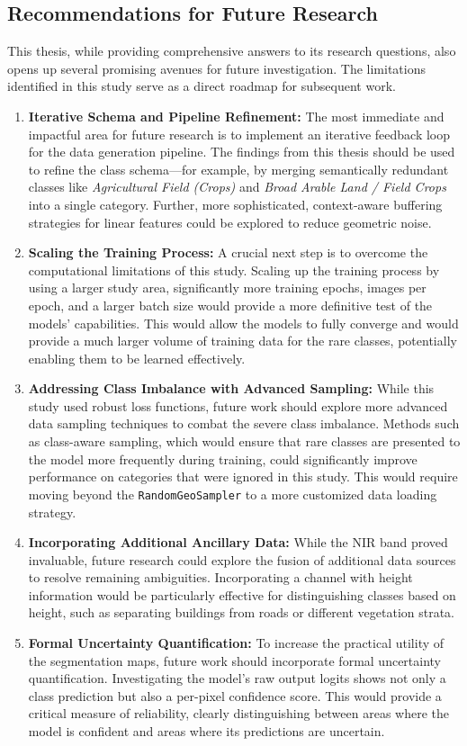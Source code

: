 \documentclass{report}
\begin{document}
\subsection{Recommendations for Future Research}
This thesis, while providing comprehensive answers to its research questions, also opens up several promising avenues for future investigation. The limitations identified in this study serve as a direct roadmap for subsequent work.
\begin{enumerate}
    \item \textbf{Iterative Schema and Pipeline Refinement:} The most immediate and impactful area for future research is to implement an iterative feedback loop for the data generation pipeline. The findings from this thesis should be used to refine the class schema—for example, by merging semantically redundant classes like \textit{Agricultural Field (Crops)} and \textit{Broad Arable Land / Field Crops} into a single category. Further, more sophisticated, context-aware buffering strategies for linear features could be explored to reduce geometric noise.
    \item \textbf{Scaling the Training Process:} A crucial next step is to overcome the computational limitations of this study. Scaling up the training process by using a larger study area, significantly more training epochs, images per epoch, and a larger batch size would provide a more definitive test of the models' capabilities. This would allow the models to fully converge and would provide a much larger volume of training data for the rare classes, potentially enabling them to be learned effectively.
    \item \textbf{Addressing Class Imbalance with Advanced Sampling:} While this study used robust loss functions, future work should explore more advanced data sampling techniques to combat the severe class imbalance. Methods such as class-aware sampling, which would ensure that rare classes are presented to the model more frequently during training, could significantly improve performance on categories that were ignored in this study. This would require moving beyond the \texttt{RandomGeoSampler} to a more customized data loading strategy.
    \item \textbf{Incorporating Additional Ancillary Data:} While the NIR band proved invaluable, future research could explore the fusion of additional data sources to resolve remaining ambiguities. Incorporating a channel with height information would be particularly effective for distinguishing classes based on height, such as separating buildings from roads or different vegetation strata.
    \item \textbf{Formal Uncertainty Quantification:} To increase the practical utility of the segmentation maps, future work should incorporate formal uncertainty quantification. Investigating the model's raw output logits shows not only a class prediction but also a per-pixel confidence score. This would provide a critical measure of reliability, clearly distinguishing between areas where the model is confident and areas where its predictions are uncertain.
\end{enumerate}
\end{document}
